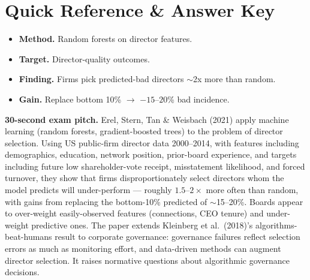 \documentclass[11pt]{article}
\begin{document}
\section*{Quick Reference \& Answer Key}
\begin{answerbox}
\begin{itemize}
\item \textbf{Method.} Random forests on director features.
\item \textbf{Target.} Director-quality outcomes.
\item \textbf{Finding.} Firms pick predicted-bad directors $\sim$2x more than random.
\item \textbf{Gain.} Replace bottom 10\% $\to$ $-15$--$20$\% bad incidence.
\end{itemize}
\end{answerbox}

\begin{keybox}
\textbf{30-second exam pitch.} Erel, Stern, Tan \& Weisbach (2021) apply machine learning (random forests, gradient-boosted trees) to the problem of director selection. Using US public-firm director data 2000--2014, with features including demographics, education, network position, prior-board experience, and targets including future low shareholder-vote receipt, misstatement likelihood, and forced turnover, they show that firms disproportionately select directors whom the model predicts will under-perform --- roughly $1.5$--$2\times$ more often than random, with gains from replacing the bottom-10\% predicted of $\sim$15--20\%. Boards appear to over-weight easily-observed features (connections, CEO tenure) and under-weight predictive ones. The paper extends Kleinberg et al.\ (2018)'s algorithms-beat-humans result to corporate governance: governance failures reflect selection errors as much as monitoring effort, and data-driven methods can augment director selection. It raises normative questions about algorithmic governance decisions.
\end{keybox}
\end{document}
